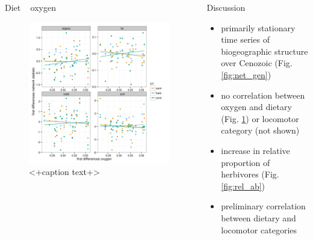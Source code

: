 \documentclass[final]{beamer}\usepackage[]{graphicx}\usepackage[]{color}
\newlength{\onecolwid}
\newlength{\twocolwid}
\begin{document}
\begin{frame}[t]
\begin{columns}[t]
\begin{column}{\twocolwid}
\begin{columns}[t,totalwidth = \twocolwid]
        \begin{column}{\onecolwid}
          \begin{block}{Diet ~ oxygen}
            \begin{figure}[ht]
              \centering
              \includegraphics[height = 0.2\textheight]{figure/dt_oxy}
              \caption{<+caption text+>}
              \label{fig:cor}
            \end{figure}
          \end{block}
        \end{column}
      \end{columns}


    \end{column}

    \begin{columns}[t,totalwidth = \onecolwid]
      \begin{column}{\onecolwid}
        \begin{block}{Discussion}
          \begin{itemize}
            \item primarily stationary time series of biogeographic structure over Cenozoic (Fig. \ref{fig:net_gen})
            \item no correlation between oxygen and dietary (Fig. \ref{fig:cor}) or locomotor category (not shown)
            \item increase in relative proportion of herbivores (Fig. \ref{fig:rel_ab})
            \item preliminary correlation between dietary and locomotor categories
          \end{itemize}
        \end{block}


\end{column}
\end{columns}
\end{columns}
\end{frame}
\end{document}
